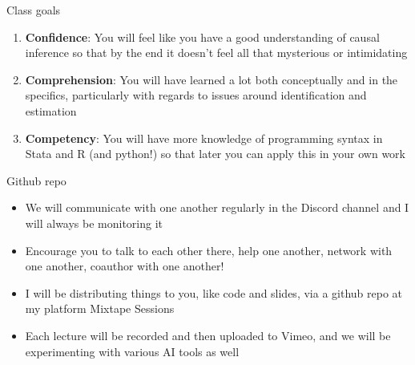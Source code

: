 \documentclass{beamer}
\begin{document}
\begin{frame}{Class goals}

  \begin{enumerate}
    \item \textbf{Confidence}: You will feel like you have a good understanding of causal inference so that by the end it doesn't feel all that mysterious or intimidating
    \item \textbf{Comprehension}: You will have learned a lot both conceptually and in the specifics, particularly with regards to issues around identification and estimation
    \item \textbf{Competency}: You will have more knowledge of programming syntax in Stata and R (and python!) so that later you can apply this in your own work
  \end{enumerate}

\end{frame}







\begin{frame}{Github repo}

  \begin{itemize}
    \item We will communicate with one another regularly in the Discord channel and I will always be monitoring it
    \item Encourage you to talk to each other there, help one another, network with one another, coauthor with one another!
    \item I will be distributing things to you, like code and slides, via a github repo at my platform Mixtape Sessions
    \item Each lecture will be recorded and then uploaded to Vimeo, and we will be experimenting with various AI tools as well
  \end{itemize}

\end{frame}
\end{document}
